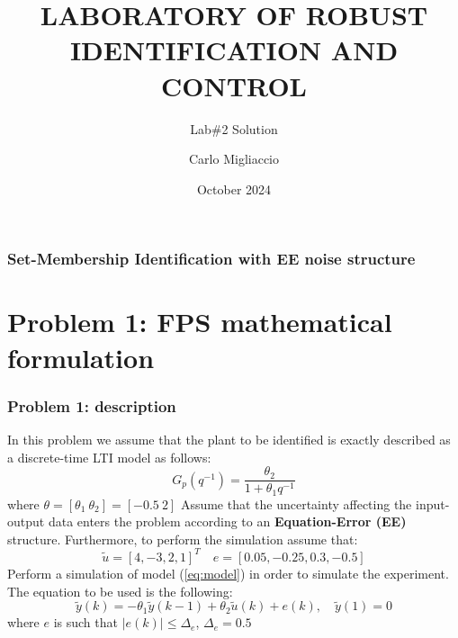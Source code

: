 \documentclass{beamer}
\title[SM SysId with EE noise structure]{
    \Large\textbf{LABORATORY OF ROBUST IDENTIFICATION AND CONTROL}
}
\subtitle{Lab\#2 Solution}
\author[Carlo Migliaccio]{Carlo Migliaccio}
\institute[PoliTO]{Master's Degreee in Computer Engineering\\
Politecnico di Torino}
\date{October 2024}
\begin{document}
\maketitle
\begin{frame}
    \frametitle{Set-Membership Identification with EE noise structure}
    \tableofcontents
\end{frame}

\section{Problem 1: FPS mathematical formulation}
\begin{frame}
    \frametitle{Problem 1: description}
    In this problem we assume that the plant to be identified is exactly described as a discrete-time LTI model as follows:
    \begin{equation}\label{eq:model}
        G_p(q^{-1})=\frac{\theta_2}{1+\theta_1{q^{-1}}}
    \end{equation}
    where $\theta=[\theta_1 \ \theta_2]=[-0.5 \ 2]$
    Assume that the uncertainty affecting the input-output data enters the problem according to an \textbf{Equation-Error (EE)} structure. Furthermore, to perform the simulation assume that:
    \begin{equation}
        \tilde{u}=[4,-3,2,1]^T \quad 
        e=[0.05,-0.25, 0.3, -0.5]
    \end{equation}
    Perform a simulation of model (\ref{eq:model}) in order to simulate the experiment. The equation to be used is the following: 
    \begin{equation}
        \tilde{y}(k)=-\theta_1\tilde{y}(k-1)+\theta_2\tilde{u}(k)+e(k), \quad \tilde{y}(1)=0
    \end{equation}
    where $e$ is such that $\vert e(k) \vert \le \Delta_e$, $\Delta_e=0.5$\\
\end{frame}
\end{document}

